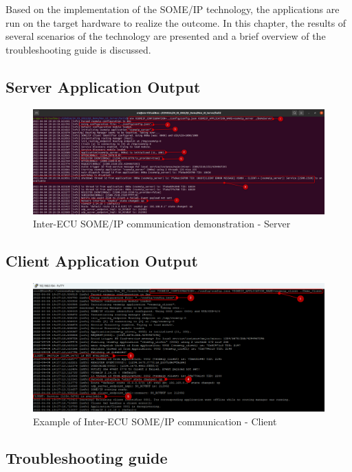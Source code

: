 Based on the implementation of the SOME/IP technology, the applications are run on the target hardware to realize the outcome. In this chapter, the results of several scenarios of the technology are presented and a brief overview of the troubleshooting guide is discussed.

\subsection{Server Application Output}
\begin{figure}[!htb]
	\centering
		\includegraphics[width=1\textwidth]{images/res_server_eth0.png}
	\caption{Inter-ECU SOME/IP communication demonstration - Server}
	\label{fig:res_server_eth0}
\end{figure}


\subsection{Client Application Output}
\begin{figure}[!htb]
	\centering
		\includegraphics[width=1\textwidth]{images/res_client_eth0.png}
	\caption{Example of Inter-ECU SOME/IP communication - Client}
	\label{fig:res_client_eth0}
\end{figure}


\subsection{Troubleshooting guide}
